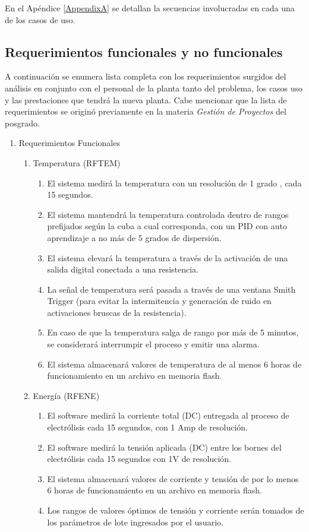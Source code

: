 En el Apéndice \ref{AppendixA} se detallan la secuencias involucradas en cada una de los casos de uso.

\subsection{ Requerimientos funcionales y no funcionales }
\label{subsec:Requerimientos}

A continuación se enumera lista completa con los requerimientos surgidos del análisis en conjunto con el personal de la planta tanto del problema, los casos uso y las prestaciones que tendrá la nueva planta. 
Cabe mencionar que la lista de requerimientos se originó previamente en la materia \emph{Gestión de Proyectos} del posgrado.

\begin{enumerate}
\item Requerimientos Funcionales
\begin{enumerate}

\item Temperatura (RFTEM)
\begin{enumerate}
\item El sistema medirá la temperatura con un resolución de 1 grado , cada 15 segundos.
\item El sistema mantendrá la temperatura controlada dentro de rangos prefijados según la cuba a cual corresponda, con un PID con auto aprendizaje a no más de 5 grados de dispersión.
\item El sistema elevará la temperatura a través de la activación de una salida digital conectada a una resistencia.
\item La señal de temperatura será pasada a través de una ventana Smith Trigger (para evitar la intermitencia y generación de ruido en activaciones bruscas de la resistencia).
\item En caso de que la temperatura salga de rango por más de 5 minutos, se considerará interrumpir el proceso y emitir una alarma.
\item El sistema almacenará valores de temperatura de al menos 6 horas de funcionamiento en un archivo en memoria flash.
\end{enumerate}

\item Energía (RFENE)
\begin{enumerate}
\item El software medirá la corriente total (DC) entregada al proceso de electrólisis cada 15 segundos, con 1 Amp de resolución.
\item El software medirá la tensión aplicada (DC) entre los bornes del electrólisis cada 15 segundos con 1V de resolución.
\item El sistema almacenará valores de corriente y tensión de por lo menos 6 horas de funcionamiento en un archivo en memoria flash.
\item Los rangos de valores óptimos de tensión y corriente serán tomados de los parámetros de lote ingresados por el usuario.
\end{enumerate}


\end{enumerate}
\end{enumerate}
